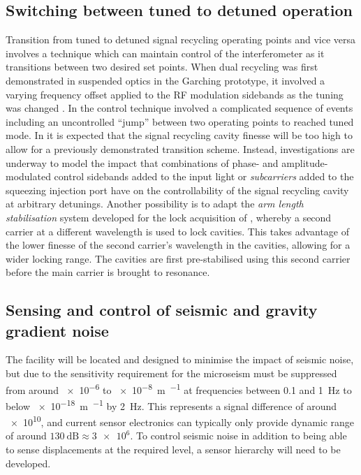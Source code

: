 \subsection{Switching between tuned to detuned operation}
Transition from tuned to detuned signal recycling operating points and vice versa involves a technique which can maintain control of the interferometer as it transitions between two desired set points. When dual recycling was first demonstrated in suspended optics in the Garching prototype, it involved a varying frequency offset applied to the \gls{RF} modulation sidebands as the tuning was changed \cite{Freise2000}. In \GEO{} the control technique involved a complicated sequence of events \cite{Grote2004} including an uncontrolled ``jump'' between two operating points \cite{Hild2007} to reached tuned mode. In \ETLF{} it is expected that the signal recycling cavity finesse will be too high to allow for a previously demonstrated transition scheme. Instead, investigations are underway to model the impact that combinations of phase- and amplitude-modulated control sidebands added to the input light or \emph{subcarriers} added to the squeezing injection port have on the controllability of the signal recycling cavity at arbitrary detunings. Another possibility is to adapt the \emph{arm length stabilisation} system developed for the lock acquisition of \ALIGO{} \cite{Mullavey2012, Staley2014}, whereby a second carrier at a different wavelength is used to lock cavities. This takes advantage of the lower finesse of the second carrier's wavelength in the cavities, allowing for a wider locking range. The cavities are first pre-stabilised using this second carrier before the main carrier is brought to resonance.

\subsection{Sensing and control of seismic and gravity gradient noise}
The \ET{} facility will be located and designed to minimise the impact of seismic noise, but due to the sensitivity requirement for \ETLF{} the microseism must be suppressed from around \num{e-6} to \SI{e-8}{\meter\per\sqrthz} at frequencies between \num{0.1} and \SI{1}{\hertz} to below \SI{e-18}{\meter\per\sqrthz} by \SI{2}{\hertz}. This represents a signal difference of around \num{e10}, and current sensor electronics can typically only provide dynamic range of around $\SI{130}{\deci\bel} \approx \num{3e6}$. To control seismic noise in addition to being able to sense displacements at the required level, a sensor hierarchy will need to be developed.

